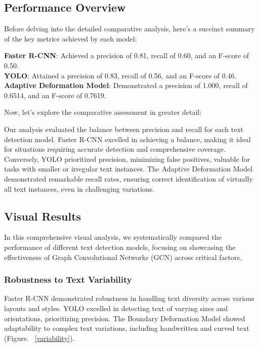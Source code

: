 \documentclass[default,iicol]{sn-jnl} %
\begin{document}
\subsection{Performance Overview}

Before delving into the detailed comparative analysis, here's a succinct summary of the key metrics achieved by each model:

\textbf{Faster R-CNN}: Achieved a precision of 0.81, recall of 0.60, and an F-score of 0.50. \\
\textbf{YOLO}: Attained a precision of 0.83, recall of 0.56, and an F-score of 0.46. \\
\textbf{Adaptive Deformation Model}: Demonstrated a precision of 1.000, recall of 0.6514, and an F-score of 0.7619.

Now, let's explore the comparative assessment in greater detail:

Our analysis evaluated the balance between precision and recall for each text detection model. Faster R-CNN excelled in achieving a balance, making it ideal for situations requiring accurate detection and comprehensive coverage. Conversely, YOLO prioritized precision, minimizing false positives, valuable for tasks with smaller or irregular text instances. The Adaptive Deformation Model demonstrated remarkable recall rates, ensuring correct identification of virtually all text instances, even in challenging variations.

\subsection{Visual Results}
In this comprehensive visual analysis, we systematically compared the performance of different text detection models, focusing on showcasing the effectiveness of Graph Convolutional Networks (GCN) across critical factors.

\subsubsection*{Robustness to Text Variability} 
Faster R-CNN demonstrated robustness in handling text diversity across various layouts and styles. YOLO excelled in detecting text of varying sizes and orientations, prioritizing precision. The Boundary Deformation Model showed adaptability to complex text variations, including handwritten and curved text (Figure. ~\ref{variability}).
\end{document}

